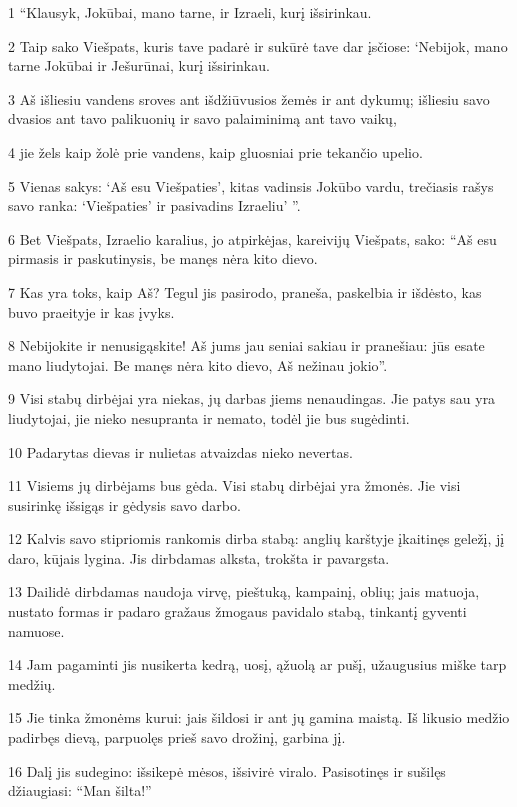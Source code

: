 \par 1 “Klausyk, Jokūbai, mano tarne, ir Izraeli, kurį išsirinkau. 
\par 2 Taip sako Viešpats, kuris tave padarė ir sukūrė tave dar įsčiose: ‘Nebijok, mano tarne Jokūbai ir Ješurūnai, kurį išsirinkau. 
\par 3 Aš išliesiu vandens sroves ant išdžiūvusios žemės ir ant dykumų; išliesiu savo dvasios ant tavo palikuonių ir savo palaiminimą ant tavo vaikų, 
\par 4 jie žels kaip žolė prie vandens, kaip gluosniai prie tekančio upelio. 
\par 5 Vienas sakys: ‘Aš esu Viešpaties’, kitas vadinsis Jokūbo vardu, trečiasis rašys savo ranka: ‘Viešpaties’ ir pasivadins Izraeliu’ ”. 
\par 6 Bet Viešpats, Izraelio karalius, jo atpirkėjas, kareivijų Viešpats, sako: “Aš esu pirmasis ir paskutinysis, be manęs nėra kito dievo. 
\par 7 Kas yra toks, kaip Aš? Tegul jis pasirodo, praneša, paskelbia ir išdėsto, kas buvo praeityje ir kas įvyks. 
\par 8 Nebijokite ir nenusigąskite! Aš jums jau seniai sakiau ir pranešiau: jūs esate mano liudytojai. Be manęs nėra kito dievo, Aš nežinau jokio”. 
\par 9 Visi stabų dirbėjai yra niekas, jų darbas jiems nenaudingas. Jie patys sau yra liudytojai, jie nieko nesupranta ir nemato, todėl jie bus sugėdinti. 
\par 10 Padarytas dievas ir nulietas atvaizdas nieko nevertas. 
\par 11 Visiems jų dirbėjams bus gėda. Visi stabų dirbėjai yra žmonės. Jie visi susirinkę išsigąs ir gėdysis savo darbo. 
\par 12 Kalvis savo stipriomis rankomis dirba stabą: anglių karštyje įkaitinęs geležį, jį daro, kūjais lygina. Jis dirbdamas alksta, trokšta ir pavargsta. 
\par 13 Dailidė dirbdamas naudoja virvę, pieštuką, kampainį, oblių; jais matuoja, nustato formas ir padaro gražaus žmogaus pavidalo stabą, tinkantį gyventi namuose. 
\par 14 Jam pagaminti jis nusikerta kedrą, uosį, ąžuolą ar pušį, užaugusius miške tarp medžių. 
\par 15 Jie tinka žmonėms kurui: jais šildosi ir ant jų gamina maistą. Iš likusio medžio padirbęs dievą, parpuolęs prieš savo drožinį, garbina jį. 
\par 16 Dalį jis sudegino: išsikepė mėsos, išsivirė viralo. Pasisotinęs ir sušilęs džiaugiasi: “Man šilta!” 
